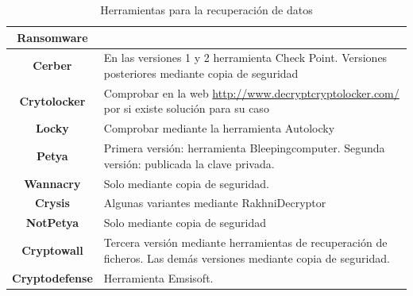     \begin{table}[htb!]
    \centering
    \scriptsize %
    \caption{Herramientas para la recuperación de datos}
    \begin{tabular}{|c|p{11.9cm}|}
        \hline
        \rowcolor[HTML]{C0C0C0}
        \textbf{Ransomware} &
        \multicolumn{1}{c|}{\cellcolor[HTML]{C0C0C0}{\textbf{Recuperación de ficheros}}} \\ \hline
        \textbf{Cerber}  &   En las versiones 1 y 2 herramienta Check Point. Versiones posteriores mediante 
        copia de seguridad \\ \hline
        \textbf{Crytolocker} & Comprobar en la web \url{http://www.decryptcryptolocker.com/} por si existe solución para su caso \\ \hline
        \textbf{Locky} & Comprobar mediante la herramienta Autolocky \\ \hline
        \textbf{Petya} & Primera versión: herramienta Bleepingcomputer. Segunda versión: publicada la clave privada. \\ \hline
        \textbf{Wannacry} & Solo mediante copia de seguridad. \\ \hline
        \textbf{Crysis}  & Algunas variantes mediante RakhniDecryptor \\ \hline
        \textbf{NotPetya}    & Solo mediante copia de seguridad \\ \hline
        \textbf{Cryptowall}  & Tercera versión mediante herramientas de recuperación de ficheros. Las demás versiones mediante copia de seguridad. \\ \hline
        \textbf{Cryptodefense} & Herramienta Emsisoft. \\ \hline 
    \end{tabular}
    \label{tab:recu}
    \end{table}